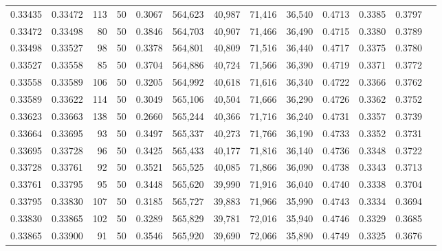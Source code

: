 \begin{tabular}{rrrrrrrrrrrrr}
0.33435 & 0.33472 &   113 &  50 &                                     0.3067 & 564,623 &  40,987 &  71,416 &  36,540 & 0.4713 & 0.3385 & 0.3797 \\
0.33472 & 0.33498 &    80 &  50 &                                     0.3846 & 564,703 &  40,907 &  71,466 &  36,490 & 0.4715 & 0.3380 & 0.3789 \\
0.33498 & 0.33527 &    98 &  50 &                                     0.3378 & 564,801 &  40,809 &  71,516 &  36,440 & 0.4717 & 0.3375 & 0.3780 \\
0.33527 & 0.33558 &    85 &  50 &                                     0.3704 & 564,886 &  40,724 &  71,566 &  36,390 & 0.4719 & 0.3371 & 0.3772 \\
0.33558 & 0.33589 &   106 &  50 &                                     0.3205 & 564,992 &  40,618 &  71,616 &  36,340 & 0.4722 & 0.3366 & 0.3762 \\
0.33589 & 0.33622 &   114 &  50 &                                     0.3049 & 565,106 &  40,504 &  71,666 &  36,290 & 0.4726 & 0.3362 & 0.3752 \\
0.33623 & 0.33663 &   138 &  50 &                                     0.2660 & 565,244 &  40,366 &  71,716 &  36,240 & 0.4731 & 0.3357 & 0.3739 \\
0.33664 & 0.33695 &    93 &  50 &                                     0.3497 & 565,337 &  40,273 &  71,766 &  36,190 & 0.4733 & 0.3352 & 0.3731 \\
0.33695 & 0.33728 &    96 &  50 &                                     0.3425 & 565,433 &  40,177 &  71,816 &  36,140 & 0.4736 & 0.3348 & 0.3722 \\
0.33728 & 0.33761 &    92 &  50 &                                     0.3521 & 565,525 &  40,085 &  71,866 &  36,090 & 0.4738 & 0.3343 & 0.3713 \\
0.33761 & 0.33795 &    95 &  50 &                                     0.3448 & 565,620 &  39,990 &  71,916 &  36,040 & 0.4740 & 0.3338 & 0.3704 \\
0.33795 & 0.33830 &   107 &  50 &                                     0.3185 & 565,727 &  39,883 &  71,966 &  35,990 & 0.4743 & 0.3334 & 0.3694 \\
0.33830 & 0.33865 &   102 &  50 &                                     0.3289 & 565,829 &  39,781 &  72,016 &  35,940 & 0.4746 & 0.3329 & 0.3685 \\
0.33865 & 0.33900 &    91 &  50 &                                     0.3546 & 565,920 &  39,690 &  72,066 &  35,890 & 0.4749 & 0.3325 & 0.3676 \\

\end{tabular}

